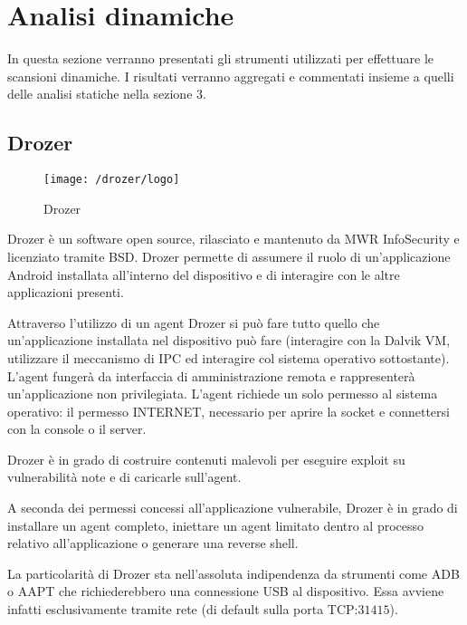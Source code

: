 \chapter{Analisi dinamiche}
In questa sezione verranno presentati gli strumenti utilizzati per effettuare le scansioni dinamiche. I risultati verranno aggregati e commentati insieme a quelli delle analisi statiche nella sezione $3$.


\section{Drozer}

\begin{figure}[h]
	\centering 
	\texttt{[image: /drozer/logo]} 
	\caption{Drozer}
	\label{fig:drozer}
\end{figure}

Drozer\cite{Drozer} è un software open source, rilasciato e mantenuto da MWR InfoSecurity e licenziato tramite BSD. Drozer permette di assumere il ruolo di un'applicazione Android installata all'interno del dispositivo e di interagire con le altre applicazioni presenti.

Attraverso l'utilizzo di un agent Drozer si può fare tutto quello che un'applicazione installata nel dispositivo può fare (interagire con la Dalvik VM, utilizzare il meccanismo di \ac{IPC} ed interagire col sistema operativo sottostante). L'agent fungerà da interfaccia di amministrazione remota e rappresenterà un'applicazione non privilegiata. L'agent richiede un solo permesso al sistema operativo: il permesso INTERNET, necessario per aprire la socket e connettersi con la console o il server. 

Drozer è in grado di costruire contenuti malevoli per eseguire exploit su vulnerabilità note e di caricarle sull'agent.

A seconda dei permessi concessi all'applicazione vulnerabile, Drozer è in grado di installare un agent completo, iniettare un agent limitato dentro al processo relativo all'applicazione o generare una reverse shell.

La particolarità di Drozer sta nell'assoluta indipendenza da strumenti come ADB o \ac{AAPT} che richiederebbero una connessione USB al dispositivo. Essa avviene infatti esclusivamente tramite rete (di default sulla porta TCP:$31415$).

